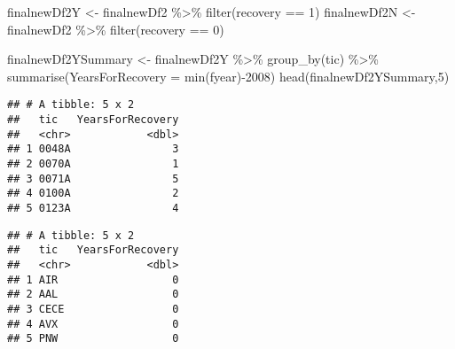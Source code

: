 \documentclass[
]{article}
\newenvironment{Shaded}{\begin{snugshade}}{\end{snugshade}}
\newcommand{\AttributeTok}[1]{\textcolor[rgb]{0.77,0.63,0.00}{#1}}
\newcommand{\DecValTok}[1]{\textcolor[rgb]{0.00,0.00,0.81}{#1}}
\newcommand{\FunctionTok}[1]{\textcolor[rgb]{0.00,0.00,0.00}{#1}}
\newcommand{\NormalTok}[1]{#1}
\newcommand{\OtherTok}[1]{\textcolor[rgb]{0.56,0.35,0.01}{#1}}
\newcommand{\SpecialCharTok}[1]{\textcolor[rgb]{0.00,0.00,0.00}{#1}}
\begin{document}
\begin{Shaded}
\begin{Highlighting}[]
\NormalTok{finalnewDf2Y }\OtherTok{\textless{}{-}}\NormalTok{ finalnewDf2 }\SpecialCharTok{\%\textgreater{}\%} \FunctionTok{filter}\NormalTok{(recovery }\SpecialCharTok{==} \DecValTok{1}\NormalTok{)}
\NormalTok{finalnewDf2N }\OtherTok{\textless{}{-}}\NormalTok{ finalnewDf2 }\SpecialCharTok{\%\textgreater{}\%} \FunctionTok{filter}\NormalTok{(recovery }\SpecialCharTok{==} \DecValTok{0}\NormalTok{)}

\NormalTok{finalnewDf2YSummary }\OtherTok{\textless{}{-}}\NormalTok{ finalnewDf2Y }\SpecialCharTok{\%\textgreater{}\%} \FunctionTok{group\_by}\NormalTok{(tic) }\SpecialCharTok{\%\textgreater{}\%} \FunctionTok{summarise}\NormalTok{(}\AttributeTok{YearsForRecovery =} \FunctionTok{min}\NormalTok{(fyear)}\SpecialCharTok{{-}}\DecValTok{2008}\NormalTok{)}
\FunctionTok{head}\NormalTok{(finalnewDf2YSummary,}\DecValTok{5}\NormalTok{)}
\end{Highlighting}
\end{Shaded}

\begin{verbatim}
## # A tibble: 5 x 2
##   tic   YearsForRecovery
##   <chr>            <dbl>
## 1 0048A                3
## 2 0070A                1
## 3 0071A                5
## 4 0100A                2
## 5 0123A                4
\end{verbatim}

\begin{Shaded}
\end{Shaded}

\begin{verbatim}
## # A tibble: 5 x 2
##   tic   YearsForRecovery
##   <chr>            <dbl>
## 1 AIR                  0
## 2 AAL                  0
## 3 CECE                 0
## 4 AVX                  0
## 5 PNW                  0
\end{verbatim}
\end{document}
